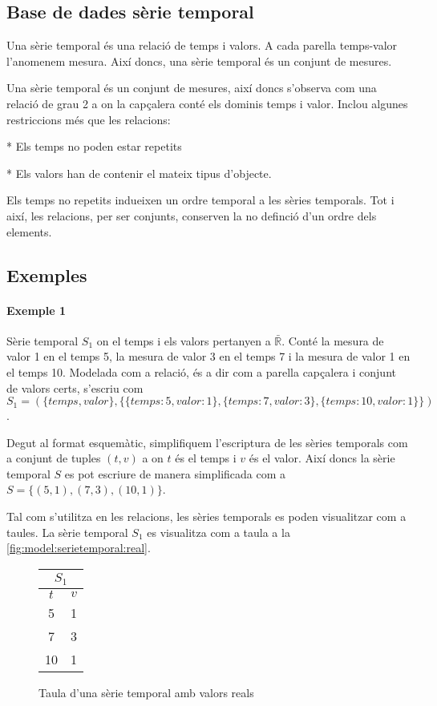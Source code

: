 \subsection{Base de dades sèrie temporal}

Una sèrie temporal és una relació de temps i valors. A cada parella temps-valor l'anomenem mesura. Així doncs, una sèrie temporal és un conjunt de mesures.

Una sèrie temporal és un conjunt de mesures, així doncs s'observa com una relació de grau 2  a on la capçalera conté els dominis temps i valor. Inclou algunes restriccions més que les relacions:

* Els temps no poden estar repetits

* Els valors han de contenir el mateix tipus d'objecte.

Els temps no repetits indueixen un ordre temporal a les sèries temporals. Tot i així, les relacions, per ser conjunts, conserven la no definció d'un ordre dels elements. 


\subsection{Exemples}

\paragraph{Exemple 1}
Sèrie temporal $S_1$ on el temps i els valors pertanyen a $\bar{\mathbb{R}}$. Conté la mesura de valor 1 en el temps 5, la mesura de valor 3 en el temps 7 i la mesura de valor 1 en el temps 10. Modelada com a relació, és a dir com a parella capçalera i conjunt de valors certs, s'escriu com 
$S_1 = ( \{temps,valor\}, \{ \{temps:5,valor:1\}, \{temps:7,valor:3\}, \{temps:10,valor:1\} \} )$.

Degut al format esquemàtic, simplifiquem l'escriptura de les sèries temporals com a conjunt de tuples $(t,v)$ a on $t$ és el temps i $v$ és el valor. Així doncs la sèrie temporal $S$ es pot escriure de manera simplificada com a 
$S = \{ (5,1), (7,3), (10,1) \}$.

Tal com s'utilitza en les relacions, les sèries temporals es poden visualitzar com a taules. La sèrie temporal $S_1$ es visualitza com a taula a la \autoref{fig:model:serietemporal:real}.

\begin{figure}[tp]
  \centering
  \begin{tabular}{|c|c|}
    \multicolumn{2}{c}{$S_1$} \\ \hline
    $t$  & $v$ \\ \hline
    5  & 1 \\
    7  & 3 \\
    10 & 1 \\ \hline
  \end{tabular}
  \caption{Taula d'una sèrie temporal amb valors reals}
  \label{fig:model:serietemporal:real}
\end{figure}



